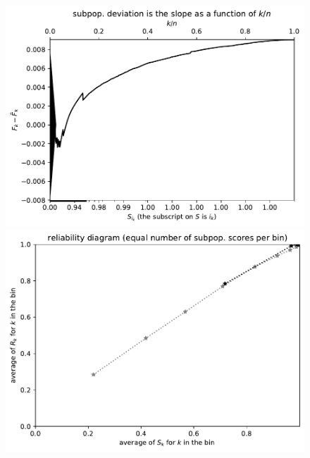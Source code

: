 \documentclass{article}
\begin{document}
\begin{figure}
\begin{centering}

\parbox{\imsize}{\includegraphics[width=\imsize]
{./codes/unweighted/prob-1-323-monarch-monarch-butterfly-milkweed-butterfly-Danaus-plexippus}}
\quad\quad
\parbox{\imsize}{\includegraphics[width=\imsize]
{./codes/unweighted/prob-1-323-monarch-monarch-butterfly-milkweed-butterfly-Danaus-plexippusequisamps10}}

\vspace{\vertsep}


\end{centering}
\end{figure}
\end{document}
